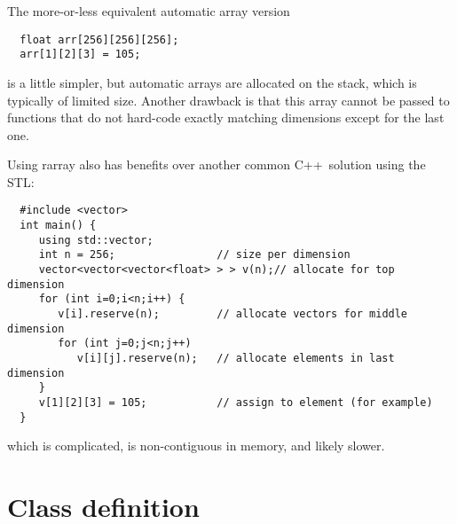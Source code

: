 \documentclass[11pt,twoside]{article}
\newcommand{\cxx}{C{++}}
\begin{document}
The more-or-less equivalent automatic array version 
\vspace{-5pt}\begin{framed}\vspace{-14pt}%
\begin{verbatim}
  float arr[256][256][256]; 
  arr[1][2][3] = 105;
\end{verbatim}
\vspace{-14pt}\end{framed}
\noindent
is a little simpler, but automatic arrays are allocated on the stack,
which is typically of limited size. Another drawback is that this array cannot be passed to functions that do
not hard-code exactly matching dimensions except for the last
one.

Using rarray also has benefits over another common \cxx\ 
solution using the STL:
\vspace{-5pt}\begin{framed}\vspace{-14pt}%
\begin{verbatim}
  #include <vector>
  int main() {
     using std::vector;
     int n = 256;                // size per dimension
     vector<vector<vector<float> > > v(n);// allocate for top dimension
     for (int i=0;i<n;i++) {
        v[i].reserve(n);         // allocate vectors for middle dimension
        for (int j=0;j<n;j++) 
           v[i][j].reserve(n);   // allocate elements in last dimension
     }
     v[1][2][3] = 105;           // assign to element (for example)
  }
\end{verbatim}%
\vspace{-14pt}\end{framed}\vspace{-8pt}
\noindent
which is complicated, is non-contiguous in memory, and likely
slower. 

\section{Class definition}
\end{document}
